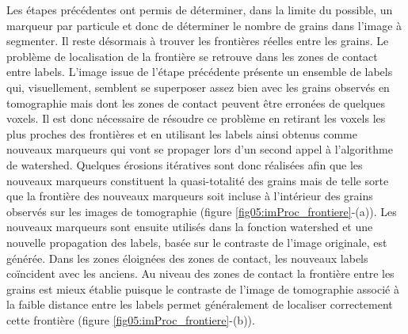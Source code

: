 		Les étapes précédentes ont permis de déterminer, dans la limite du possible, un marqueur par particule et donc de déterminer le nombre de grains dans l'image à segmenter. Il reste désormais à trouver les frontières réelles entre les grains. Le problème de localisation de la frontière se retrouve dans les zones de contact entre labels. L'image issue de l'étape précédente présente un ensemble de labels qui, visuellement, semblent se superposer assez bien avec les grains observés en tomographie mais dont les zones de contact peuvent être erronées de quelques voxels. Il est donc nécessaire de résoudre ce problème en retirant les voxels les plus proches des frontières et en utilisant les labels ainsi obtenus comme nouveaux marqueurs qui vont se propager lors d'un second appel à l'algorithme de watershed. Quelques érosions itératives sont donc réalisées afin que les nouveaux marqueurs constituent la quasi-totalité des grains mais de telle sorte que la frontière des nouveaux marqueurs soit incluse à l'intérieur des grains observés sur les images de tomographie (figure \ref{fig05:imProc_frontiere}-(a)). Les nouveaux marqueurs sont ensuite utilisés dans la fonction watershed et une nouvelle propagation des labels, basée sur le contraste de l'image originale, est générée. Dans les zones éloignées des zones de contact, les nouveaux labels coïncident avec les anciens. Au niveau des zones de contact la frontière entre les grains est mieux établie puisque le contraste de l'image de tomographie associé à la faible distance entre les labels permet généralement de localiser correctement cette frontière (figure \ref{fig05:imProc_frontiere}-(b)).
